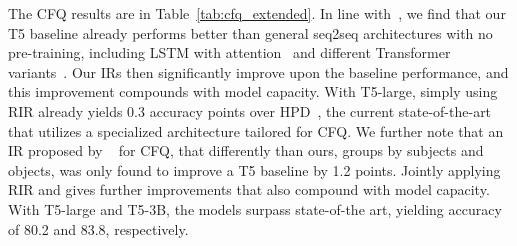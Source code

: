 \begin{table}[t]
\centering
{}
\caption{Text-to-SQL test set results on the template splits, for different model sizes and in comparison with previous work: ~\cite{finegan-dollak-etal-2018-improving}, ~\cite{andreas-2020-good}, and ~\cite{zheng2020compositional}.}
\label{tab:sql_extended}
\end{table}

The CFQ results are in Table~\ref{tab:cfq_extended}.
In line with~\citet{furrer2020compositional}, we find that our T5 baseline already performs better than general seq2seq architectures with no pre-training, including LSTM with attention~\cite{bahdanau2015neural} and different Transformer variants~\cite{NIPS2017_3f5ee243,dehghani2018universal,so2019evolved}.
Our IRs then significantly improve upon the baseline performance, and this improvement compounds with model capacity. With T5-large, simply using RIR already yields 0.3 accuracy points over HPD~\cite{guo2020hierarchical}, the current state-of-the-art that utilizes a specialized architecture tailored for CFQ. We further note that an IR proposed by ~\citet{furrer2020compositional} for CFQ, that differently than ours, groups by subjects and objects, was only found to improve a T5 baseline by 1.2 points.
Jointly applying RIR and \LIRind{} gives further improvements that also compound with model capacity. With T5-large and T5-3B, the models surpass state-of-the art, yielding accuracy of 80.2 and 83.8, respectively.

